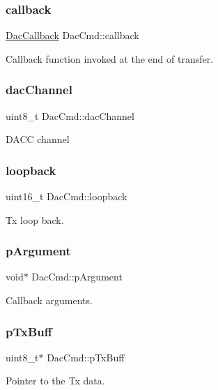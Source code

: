 \subsubsection{\texorpdfstring{callback}{callback}}
{\footnotesize\ttfamily \mbox{\hyperlink{dac__dma_8h_af9a1c1e4392c0aa064b7f6b6dfd0d75e}{Dac\+Callback}} Dac\+Cmd\+::callback}

Callback function invoked at the end of transfer. \mbox{\label{structDacCmd_ad2777b72bf9a239403de59ce63cc27e0}} 
\subsubsection{\texorpdfstring{dacChannel}{dacChannel}}
{\footnotesize\ttfamily uint8\+\_\+t Dac\+Cmd\+::dac\+Channel}

D\+A\+CC channel \mbox{\label{structDacCmd_aeb652d588aef33cfd8a1cd4d8de7ab2e}} 
\subsubsection{\texorpdfstring{loopback}{loopback}}
{\footnotesize\ttfamily uint16\+\_\+t Dac\+Cmd\+::loopback}

Tx loop back. \mbox{\label{structDacCmd_a6b9d2d498beb9a7ccacb0ee06efc2931}} 
\subsubsection{\texorpdfstring{pArgument}{pArgument}}
{\footnotesize\ttfamily void$\ast$ Dac\+Cmd\+::p\+Argument}

Callback arguments. \mbox{\label{structDacCmd_a0ada14dbfd86905a3723c5a9b3a76b84}} 
\subsubsection{\texorpdfstring{pTxBuff}{pTxBuff}}
{\footnotesize\ttfamily uint8\+\_\+t$\ast$ Dac\+Cmd\+::p\+Tx\+Buff}

Pointer to the Tx data. \mbox{\label{structDacCmd_a961247bd9e0876a0ff5d6e8bcb31fa73}} 
